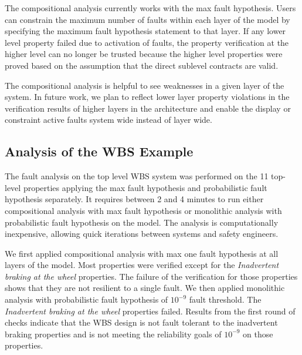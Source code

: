 The compositional analysis currently works with the max fault hypothesis. Users can constrain the maximum number of faults within each layer of the model by specifying the maximum fault hypothesis statement to that layer. If any lower level property failed due to activation of faults, the property verification at the higher level can no longer be trusted because the higher level properties were proved based on the assumption that the direct sublevel contracts are valid.

The compositional analysis is helpful to see weaknesses in a given 
layer of the system. In future work, we plan to reflect lower layer
property violations in the verification results of higher layers in the architecture and enable the display or constraint active faults system wide instead of layer wide.


\subsection{Analysis of the WBS Example}
\label{sec:results}

The fault analysis on the top level WBS system was performed on the 11 top-level properties applying the max fault hypothesis and probabilistic fault hypothesis separately. It requires between 2 and 4 minutes to run either compositional analysis with max fault hypothesis or monolithic analysis with probabilistic fault hypothesis on the model. The analysis is computationally inexpensive, allowing quick iterations between systems and safety engineers.

We first applied compositional analysis with max one fault hypothesis at all layers of the model. Most properties were verified except for the \textit{Inadvertent braking at the wheel} properties. The failure of the verification for those properties shows that they are not resilient to a single fault. We then applied monolithic analysis with probabilistic fault hypothesis of $10^{-9}$ fault threshold. The \textit{Inadvertent braking at the wheel} properties failed. Results from the first round of checks indicate that the WBS design is not fault tolerant to the inadvertent braking properties and is not meeting the reliability goals of $10^{-9}$ on those properties.

